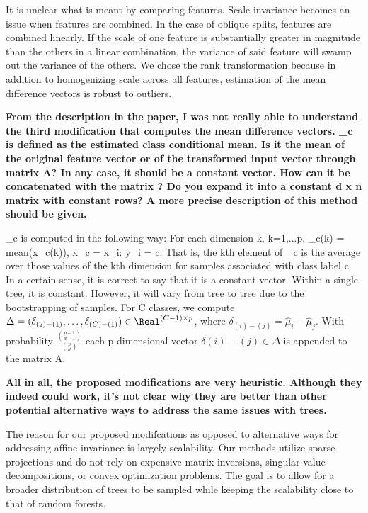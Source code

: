 It is unclear what is meant by comparing features. Scale invariance becomes an issue when features are combined. In the case of oblique splits, features are combined linearly. If the scale of one feature is substantially greater in magnitude than the others in a linear combination, the variance of said feature will swamp out the variance of the others. We chose the rank transformation because in addition to homogenizing scale across all features, estimation of the mean difference vectors is robust to outliers. 

\textbf{From the description in the paper, I was not really able to understand the third modification that computes the mean difference vectors. \hat{\mu}_c is defined as the estimated class conditional mean. Is it the mean of the original feature vector or of the transformed input vector through matrix A? In any case, it should be a constant vector. How can it be concatenated with the matrix ? Do you expand it into a constant d x n matrix with constant rows? A more precise description of this method should be given.}

\hat{\mu}_c is computed in the following way: For each dimension k, k=1,...p, \hat{\mu}_c(k) = mean(x_c(k)), x_c = {x_i: y_i = c}. That is, the kth element of \hat{\mu}_c is the average over those values of the kth dimension for samples associated with class label c. In a certain sense, it is correct to say that it is a constant vector. Within a single tree, it is constant. However, it will vary from tree to tree due to the bootstrapping of samples. For C classes, we compute $\Delta = (\delta_{(2)-(1)}, \ldots, \delta_{(C)-(1)}) \in \Real^{(C-1) \times p}$, where $\delta_{(i)-(j)} = \hat{\mu}_i - \hat{\mu}_j$. With probability $\frac{\binom{p-1}{d-1}}{\binom{p}{d}}$ each p-dimensional vector $\delta{(i)-(j)} \in \Delta$ is appended to the matrix A. 

\textbf{All in all, the proposed modifications are very heuristic. Although they indeed could work, it’s not clear why they are better than other potential alternative ways to address the same issues with trees.}

The reason for our proposed modifcations as opposed to alternative ways for addressing affine invariance is largely scalability. Our methods utilize sparse projections and do not rely on expensive matrix inversions, singular value decompositions, or convex optimization problems. The goal is to allow for a broader distribution of trees to be sampled while keeping the scalability close to that of random forests. 

